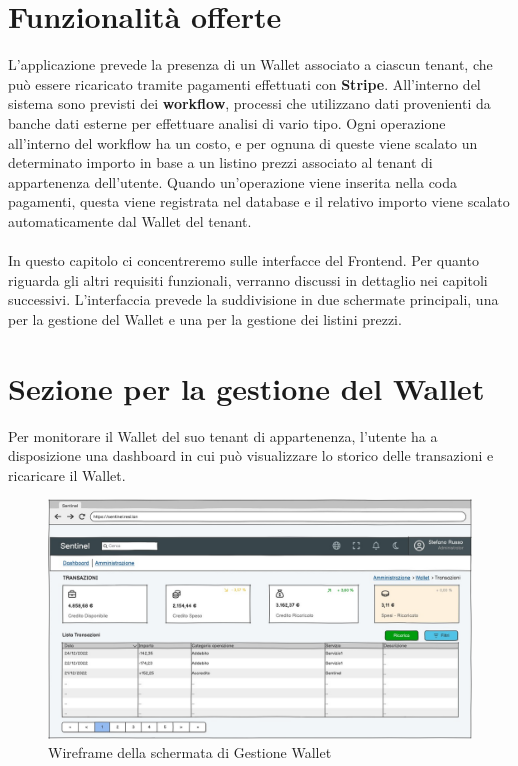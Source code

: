 \section{Funzionalit\`a offerte}
L'applicazione prevede la presenza di un Wallet associato a ciascun tenant, che pu\`o essere ricaricato tramite pagamenti effettuati con \textbf{Stripe}.
All'interno del sistema sono previsti dei \textbf{workflow}, processi che utilizzano dati provenienti da banche dati esterne per effettuare analisi di vario tipo.
Ogni operazione all'interno del workflow ha un costo, e per ognuna di queste viene scalato un determinato importo in base a un listino prezzi associato al tenant di appartenenza dell'utente.
Quando un'operazione viene inserita nella coda pagamenti, questa viene registrata nel database e il relativo importo viene scalato automaticamente dal Wallet del tenant.
\\\\
In questo capitolo ci concentreremo sulle interfacce del Frontend. Per quanto riguarda gli altri requisiti funzionali, verranno discussi in dettaglio nei capitoli successivi.
L'interfaccia prevede la suddivisione in due schermate principali, una per la gestione del Wallet e una per la gestione dei listini prezzi.

\section{Sezione per la gestione del Wallet}
Per monitorare il Wallet del suo tenant di appartenenza, l'utente ha a disposizione una dashboard in cui pu\`o visualizzare lo storico delle transazioni e ricaricare il Wallet.

\begin{figure}[H]
  \centering
  \includegraphics[width=13cm]{images/gestione-wallet/mock-gestione-wallet.png}
  \caption{Wireframe della schermata di Gestione Wallet}
\end{figure}

